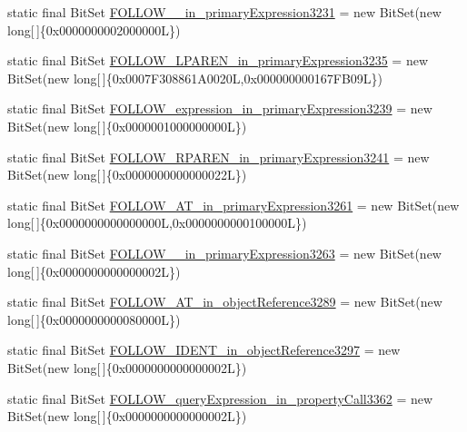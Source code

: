 \begin{DoxyCompactItemize}
\item 
static final Bit\-Set \hyperlink{classorg_1_1tzi_1_1use_1_1parser_1_1soil_1_1_soil_parser_acf0f91f5858c220be31432c0a6cebbe0}{F\-O\-L\-L\-O\-W\-\_\-\_\-in\-\_\-primary\-Expression3231} = new Bit\-Set(new long\mbox{[}$\,$\mbox{]}\{0x0000000002000000\-L\})
\item 
static final Bit\-Set \hyperlink{classorg_1_1tzi_1_1use_1_1parser_1_1soil_1_1_soil_parser_a8385f8163bc55282c8ce59e78a818704}{F\-O\-L\-L\-O\-W\-\_\-\-L\-P\-A\-R\-E\-N\-\_\-in\-\_\-primary\-Expression3235} = new Bit\-Set(new long\mbox{[}$\,$\mbox{]}\{0x0007\-F308861\-A0020\-L,0x000000000167\-F\-B09\-L\})
\item 
static final Bit\-Set \hyperlink{classorg_1_1tzi_1_1use_1_1parser_1_1soil_1_1_soil_parser_a5aadca012716d21e7153b353184eb2b8}{F\-O\-L\-L\-O\-W\-\_\-expression\-\_\-in\-\_\-primary\-Expression3239} = new Bit\-Set(new long\mbox{[}$\,$\mbox{]}\{0x0000001000000000\-L\})
\item 
static final Bit\-Set \hyperlink{classorg_1_1tzi_1_1use_1_1parser_1_1soil_1_1_soil_parser_a2c6ce64dc9ad78a985199fd0cb4e3d92}{F\-O\-L\-L\-O\-W\-\_\-\-R\-P\-A\-R\-E\-N\-\_\-in\-\_\-primary\-Expression3241} = new Bit\-Set(new long\mbox{[}$\,$\mbox{]}\{0x0000000000000022\-L\})
\item 
static final Bit\-Set \hyperlink{classorg_1_1tzi_1_1use_1_1parser_1_1soil_1_1_soil_parser_a58124e2c9689a86306cd4949db06a6f5}{F\-O\-L\-L\-O\-W\-\_\-\-A\-T\-\_\-in\-\_\-primary\-Expression3261} = new Bit\-Set(new long\mbox{[}$\,$\mbox{]}\{0x0000000000000000\-L,0x0000000000100000\-L\})
\item 
static final Bit\-Set \hyperlink{classorg_1_1tzi_1_1use_1_1parser_1_1soil_1_1_soil_parser_af5d9bc5d08ccb192bad3d4e190292830}{F\-O\-L\-L\-O\-W\-\_\-\_\-in\-\_\-primary\-Expression3263} = new Bit\-Set(new long\mbox{[}$\,$\mbox{]}\{0x0000000000000002\-L\})
\item 
static final Bit\-Set \hyperlink{classorg_1_1tzi_1_1use_1_1parser_1_1soil_1_1_soil_parser_afbba596efa85cbcdb11479b9d6f085a3}{F\-O\-L\-L\-O\-W\-\_\-\-A\-T\-\_\-in\-\_\-object\-Reference3289} = new Bit\-Set(new long\mbox{[}$\,$\mbox{]}\{0x0000000000080000\-L\})
\item 
static final Bit\-Set \hyperlink{classorg_1_1tzi_1_1use_1_1parser_1_1soil_1_1_soil_parser_a77de1859629bb2591d91b297df729115}{F\-O\-L\-L\-O\-W\-\_\-\-I\-D\-E\-N\-T\-\_\-in\-\_\-object\-Reference3297} = new Bit\-Set(new long\mbox{[}$\,$\mbox{]}\{0x0000000000000002\-L\})
\item 
static final Bit\-Set \hyperlink{classorg_1_1tzi_1_1use_1_1parser_1_1soil_1_1_soil_parser_aa588decea2adb7254774fa983c96d441}{F\-O\-L\-L\-O\-W\-\_\-query\-Expression\-\_\-in\-\_\-property\-Call3362} = new Bit\-Set(new long\mbox{[}$\,$\mbox{]}\{0x0000000000000002\-L\})

\end{DoxyCompactItemize}
